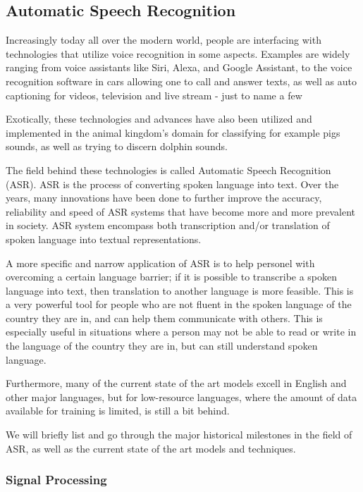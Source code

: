 \subsection{Automatic Speech Recognition}

Increasingly today all over the modern world, people are interfacing with technologies that utilize voice recognition in some aspects. Examples are widely ranging from voice assistants like Siri, Alexa, and Google Assistant, to the voice recognition software in cars allowing one to call and answer texts, as well as auto captioning for videos, television and live stream - just to name a few \cite{YouTubeCaptions}\cite{HuggingFaceASR}\cite{AppleSiri}

Exotically, these technologies and advances have also been utilized and implemented in the animal kingdom's domain for classifying for example pigs sounds, as well as trying to discern dolphin sounds.

The field behind these technologies is called Automatic Speech Recognition (ASR). ASR is the process of converting spoken language into text. Over the years, many innovations have been done to further improve the accuracy, reliability and speed of ASR systems that have become more and more prevalent in society. ASR system encompass both transcription and/or translation of spoken language into textual representations.

A more specific and narrow application of ASR is to help personel with overcoming a certain language barrier; if it is possible to transcribe a spoken language into text, then translation to another language is more feasible. This is a very powerful tool for people who are not fluent in the spoken language of the country they are in, and can help them communicate with others. This is especially useful in situations where a person may not be able to read or write in the language of the country they are in, but can still understand spoken language.

Furthermore, many of the current state of the art models excell in English and other major languages, but for low-resource languages, where the amount of data available for training is limited, is still a bit behind.

We will briefly list and go through the major historical milestones in the field of ASR, as well as the current state of the art models and techniques.

\subsubsection{Signal Processing}

